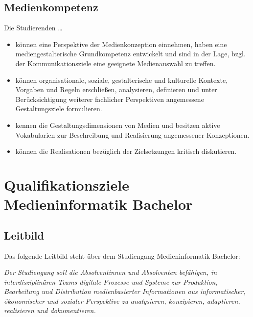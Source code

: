 \subsection{Medienkompetenz\label{/mi-2017/selbstbericht/0200-qualifikationsziele/0000-qualifikationsziele}}\label{medienkompetenzpathlabelmi-2017selbstbericht0200-qualifikationsziele0000-qualifikationsziele}

Die Studierenden \ldots{}

\begin{itemize}
\tightlist
\item
  können eine Perspektive der Medienkonzeption einnehmen, haben eine
  mediengestalterische Grundkompetenz entwickelt und sind in der Lage,
  bzgl. der Kommunikationsziele eine geeignete Medienauswahl zu treffen.
\item
  können organisationale, soziale, gestalterische und kulturelle
  Kontexte, Vorgaben und Regeln erschließen, analysieren, definieren und
  unter Berücksichtigung weiterer fachlicher Perspektiven angemessene
  Gestaltungsziele formulieren.
\item
  kennen die Gestaltungsdimensionen von Medien und besitzen aktive
  Vokabularien zur Beschreibung und Realisierung angemessener
  Konzeptionen.
\item
  können die Realisationen bezüglich der Zielsetzungen kritisch
  diskutieren.
\end{itemize}

\section{Qualifikationsziele Medieninformatik
Bachelor\label{/mi-2017/selbstbericht/0200-qualifikationsziele/0000-qualifikationsziele}}\label{qualifikationsziele-medieninformatik-bachelorpathlabelmi-2017selbstbericht0200-qualifikationsziele0000-qualifikationsziele}

\subsection{Leitbild\label{/mi-2017/selbstbericht/0200-qualifikationsziele/0000-qualifikationsziele}}\label{leitbildpathlabelmi-2017selbstbericht0200-qualifikationsziele0000-qualifikationsziele}

Das folgende Leitbild steht über dem Studiengang Medieninformatik
Bachelor:

\emph{Der Studiengang soll die Absolventinnen und Absolventen befähigen,
in interdisziplinären Teams digitale Prozesse und Systeme zur
Produktion, Bearbeitung und Distribution medienbasierter Informationen
aus informatischer, ökonomischer und sozialer Perspektive zu
analysieren, konzipieren, adaptieren, realisieren und dokumentieren.}

